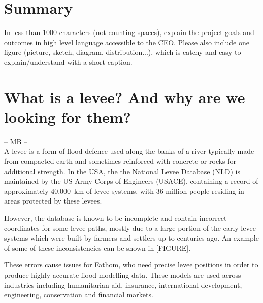 \documentclass[NOTE, disdraft=true, UKenglish]{\DISCDTLATEXPATH UCLCDTDISdoc}
\begin{document}
\maketitle

\tableofcontents

\clearpage


\newpage
\section{Summary}
\label{sec:summary}
In less than 1000 characters (not counting spaces), explain the project goals and outcomes in high level  language accessible to the CEO. Please also include one figure (picture, sketch, diagram, distribution...), which is catchy and easy to explain/understand with a short caption.

\newpage
\section{What is a levee? And why are we looking for them?}
\label{sec:introduction}
%
-- MB --\\
A levee is a form of flood defence used along the banks of a river typically made from compacted earth and sometimes reinforced with concrete or rocks for additional strength. In the USA, the the National Levee Database (NLD) is maintained by the US Army Corps of Engineers (USACE), containing a record of approximately 40,000~km of levee systems, with 36 million people residing in areas protected by these levees.

However, the database is known to be incomplete and contain incorrect coordinates for some levee paths, mostly due to a large portion of the early levee systems which were built by farmers and settlers up to centuries ago. An example of some of these inconsistencies can be shown in [FIGURE].

These errors cause issues for Fathom, who need precise levee positions in order to produce highly accurate flood modelling data. These models are used across industries including humanitarian aid, insurance, international development, engineering, conservation and financial markets.
\end{document}

